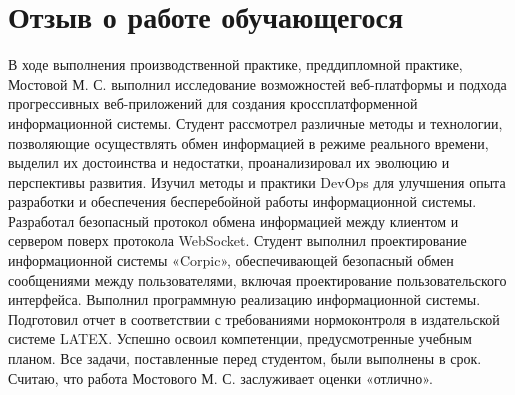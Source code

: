 
\clearpage
\section*{Отзыв о работе обучающегося}

В ходе выполнения производственной практике, преддипломной практике, Мостовой М. С. выполнил исследование возможностей веб-платформы и подхода прогрессивных веб-приложений для создания кроссплатформенной информационной системы. Студент рассмотрел различные методы и технологии, позволяющие осуществлять обмен информацией в режиме реального времени, выделил их достоинства и недостатки, проанализировал их эволюцию и перспективы развития. Изучил методы и практики DevOps для улучшения опыта разработки и обеспечения бесперебойной работы информационной системы. Разработал безопасный протокол обмена информацией между клиентом и сервером поверх протокола WebSocket. Студент выполнил проектирование информационной системы «Corpic», обеспечивающей безопасный обмен сообщениями между пользователями, включая проектирование пользовательского интерфейса. Выполнил программную реализацию информационной системы. Подготовил отчет в соответствии с требованиями нормоконтроля в издательской системе LATEX. Успешно освоил компетенции, предусмотренные учебным планом. Все задачи, поставленные перед студентом, были выполнены в срок. Считаю, что работа Мостового М. С. заслуживает оценки «отлично».

\progressapprov
